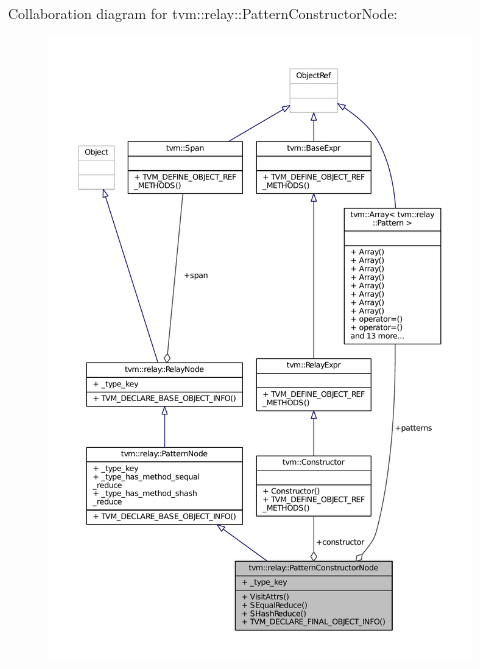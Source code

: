 Collaboration diagram for tvm\+:\+:relay\+:\+:Pattern\+Constructor\+Node\+:
\nopagebreak
\begin{figure}[H]
\begin{center}
\leavevmode
\includegraphics[width=350pt]{classtvm_1_1relay_1_1PatternConstructorNode__coll__graph}
\end{center}
\end{figure}
